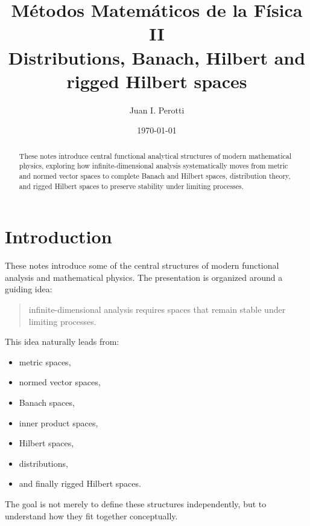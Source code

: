 \documentclass[aps,prl,twocolumn,groupedaddress]{revtex4-2}
\begin{document}
\title{
M\'etodos Matem\'aticos de la F\'isica II\\
Distributions, Banach, Hilbert and rigged Hilbert spaces
}

\author{Juan I. Perotti}

\date{\today}

\begin{abstract}
These notes introduce central functional analytical structures of modern mathematical physics, exploring how infinite-dimensional analysis systematically moves from metric and normed vector spaces to complete Banach and Hilbert spaces, distribution theory, and rigged Hilbert spaces to preserve stability under limiting processes.
\end{abstract}

\maketitle
\onecolumngrid

\section*{Introduction}

These notes introduce some of the central structures of modern functional analysis and mathematical physics. The presentation is organized around a guiding idea:
\begin{quote}
infinite-dimensional analysis requires spaces that remain stable under limiting processes.
\end{quote}
This idea naturally leads from:
\begin{itemize}
\item metric spaces,
\item normed vector spaces,
\item Banach spaces,
\item inner product spaces,
\item Hilbert spaces,
\item distributions,
\item and finally rigged Hilbert spaces.
\end{itemize}
The goal is not merely to define these structures independently, but to understand how they fit together conceptually.
\end{document}
